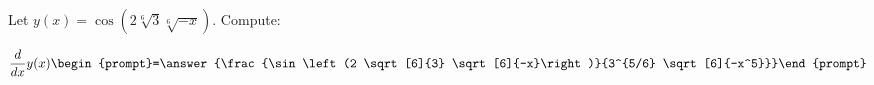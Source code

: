 \documentclass{ximera}
\author{Bart Snapp}
\begin{document}
\begin{exercise}
Let $y(x) = \cos \left(2 \sqrt[6]{3} \sqrt[6]{-x}\right)$. Compute:

\[
\dd{x}y(x)
\begin{prompt}=\answer{\frac{\sin \left(2 \sqrt[6]{3} \sqrt[6]{-x}\right)}{3^{5/6} \sqrt[6]{-x^5}}}\end{prompt}
\]
\end{exercise}
\end{document}
